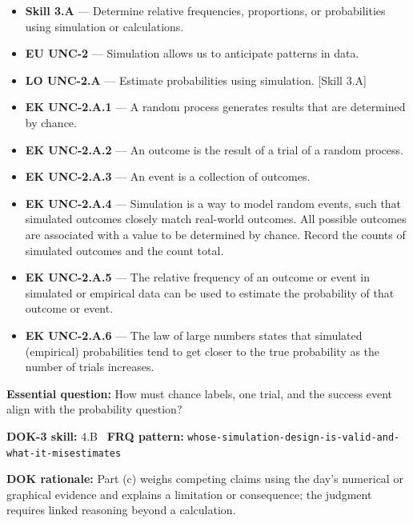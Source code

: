 \documentclass[11pt]{article}
\begin{document}


{\small
\begin{itemize}[leftmargin=1.5em,itemsep=2pt,topsep=2pt]
  \item \textbf{Skill 3.A} --- Determine relative frequencies, proportions, or probabilities using simulation or calculations.
  \item \textbf{EU UNC-2} --- Simulation allows us to anticipate patterns in data.
  \item \textbf{LO UNC-2.A} --- Estimate probabilities using simulation. [Skill 3.A]
  \item \textbf{EK UNC-2.A.1} --- A random process generates results that are determined by chance.
  \item \textbf{EK UNC-2.A.2} --- An outcome is the result of a trial of a random process.
  \item \textbf{EK UNC-2.A.3} --- An event is a collection of outcomes.
  \item \textbf{EK UNC-2.A.4} --- Simulation is a way to model random events, such that simulated outcomes closely match real-world outcomes. All possible outcomes are associated with a value to be determined by chance. Record the counts of simulated outcomes and the count total.
  \item \textbf{EK UNC-2.A.5} --- The relative frequency of an outcome or event in simulated or empirical data can be used to estimate the probability of that outcome or event.
  \item \textbf{EK UNC-2.A.6} --- The law of large numbers states that simulated (empirical) probabilities tend to get closer to the true probability as the number of trials increases.
\end{itemize}
}
\textbf{Essential question:} How must chance labels, one trial, and the success event align with the probability question?\par
\textbf{DOK-3 skill:} 4.B \textperiodcentered\ \textbf{FRQ pattern:} {\small\texttt{whose-\allowbreak{}simulation-\allowbreak{}design-\allowbreak{}is-\allowbreak{}valid-\allowbreak{}and-\allowbreak{}what-\allowbreak{}it-\allowbreak{}misestimates}}\par
\textbf{DOK rationale:} Part (c) weighs competing claims using the day's numerical or graphical evidence and explains a limitation or consequence; the judgment requires linked reasoning beyond a calculation.\par
\end{document}
